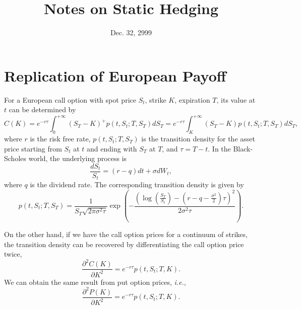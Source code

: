 \documentclass[12pt]{article}
\begin{document}
\title{Notes on Static Hedging}
\date{Dec. 32, 2999}

\maketitle

\section{Replication of European Payoff}

  For a European call option with spot price $S_t$, strike $K$, expiration $T$, its value at $t$ can be determined by
  \begin{equation}
    C(K) = e^{-r\tau}\int_{0}^{+\infty}(S_T-K)^+p(t,S_t;T,S_T)dS_T = e^{-r\tau}\int_{K}^{+\infty}(S_T-K)p(t,S_t;T,S_T)dS_T,
  \end{equation}
  where $r$ is the risk free rate, $p(t,S_t;T,S_T)$ is the transition density for the asset price starting from $S_t$ at $t$ and
  ending with $S_T$ at $T$, and $\tau=T-t$. In the Black-Scholes world, the underlying process is
  \begin{equation}
    \frac{dS_t}{S_t}=(r-q)dt+\sigma dW_t,
  \end{equation}
  where $q$ is the dividend rate. The corresponding transition density is given by
  \begin{equation}
    p(t,S_t;T,S_T)=\frac{1}{S_T\sqrt{2\pi\sigma^2\tau}}
    \exp\left(-\frac{\displaystyle \left(\log\left(\frac{S_T}{S_t}\right)-\left(r-q-\frac{\sigma^2}{2}\right)\tau\right)^2}{2\sigma^2\tau}\right).
    \label{density}
  \end{equation}

  On the other hand, if we have the call option prices for a continuum of strikes, the transition density can be recovered by
  differentiating the call option price twice,
  \begin{equation}
    \frac{\partial^2C(K)}{\partial K^2}=e^{-r\tau}p(t,S_t;T,K).
  \end{equation}
  We can obtain the same result from put option prices, {\it i.e.},
  \begin{equation}
    \frac{\partial^2P(K)}{\partial K^2}=e^{-r\tau}p(t,S_t;T,K).
  \end{equation}
\end{document}
